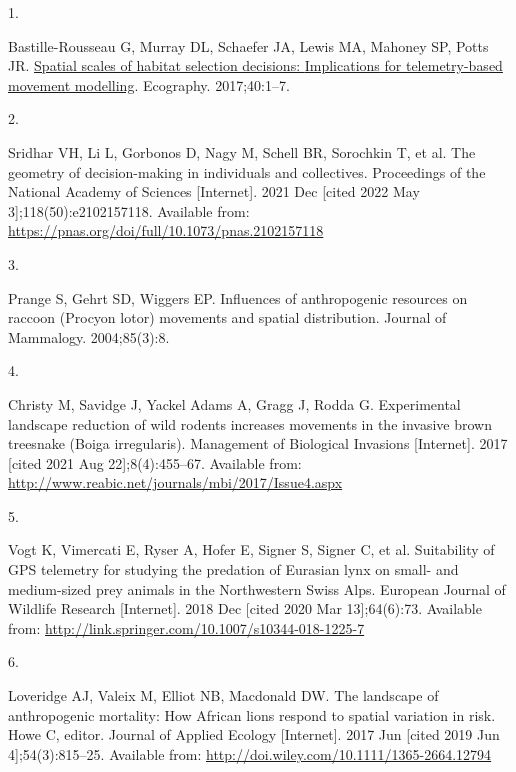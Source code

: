\documentclass[10pt,a4paper]{article}
\newlength{\cslhangindent}
\newlength{\csllabelwidth}
\newlength{\cslentryspacingunit} %
\newenvironment{CSLReferences}[2] %
 {%
  \setlength{\parindent}{0pt}
  \ifodd #1
  \let\oldpar\par
  \def\par{\hangindent=\cslhangindent\oldpar}
  \fi
  \setlength{\parskip}{#2\cslentryspacingunit}
 }%
 {}
\newcommand{\CSLLeftMargin}[1]{\parbox[t]{\csllabelwidth}{#1}}
\newcommand{\CSLRightInline}[1]{\parbox[t]{\linewidth - \csllabelwidth}{#1}\break}
\begin{document}
\hypertarget{refs}{}
\begin{CSLReferences}{0}{0}
\leavevmode{}%
\CSLLeftMargin{1. }
\CSLRightInline{Bastille-Rousseau G, Murray DL, Schaefer JA, Lewis MA, Mahoney SP, Potts JR. \href{https://doi.org/10.1111/ecog.02655}{Spatial scales of habitat selection decisions: {Implications} for telemetry-based movement modelling}. Ecography. 2017;40:1--7. }

\leavevmode{}%
\CSLLeftMargin{2. }
\CSLRightInline{Sridhar VH, Li L, Gorbonos D, Nagy M, Schell BR, Sorochkin T, et al. The geometry of decision-making in individuals and collectives. Proceedings of the National Academy of Sciences {[}Internet{]}. 2021 Dec {[}cited 2022 May 3{]};118(50):e2102157118. Available from: \url{https://pnas.org/doi/full/10.1073/pnas.2102157118}}

\leavevmode{}%
\CSLLeftMargin{3. }
\CSLRightInline{Prange S, Gehrt SD, Wiggers EP. Influences of anthropogenic resources on raccoon ({Procyon} lotor) movements and spatial distribution. Journal of Mammalogy. 2004;85(3):8. }

\leavevmode{}%
\CSLLeftMargin{4. }
\CSLRightInline{Christy M, Savidge J, Yackel Adams A, Gragg J, Rodda G. Experimental landscape reduction of wild rodents increases movements in the invasive brown treesnake ({Boiga} irregularis). Management of Biological Invasions {[}Internet{]}. 2017 {[}cited 2021 Aug 22{]};8(4):455--67. Available from: \url{http://www.reabic.net/journals/mbi/2017/Issue4.aspx}}

\leavevmode{}%
\CSLLeftMargin{5. }
\CSLRightInline{Vogt K, Vimercati E, Ryser A, Hofer E, Signer S, Signer C, et al. Suitability of {GPS} telemetry for studying the predation of {Eurasian} lynx on small- and medium-sized prey animals in the {Northwestern} {Swiss} {Alps}. European Journal of Wildlife Research {[}Internet{]}. 2018 Dec {[}cited 2020 Mar 13{]};64(6):73. Available from: \url{http://link.springer.com/10.1007/s10344-018-1225-7}}

\leavevmode{}%
\CSLLeftMargin{6. }
\CSLRightInline{Loveridge AJ, Valeix M, Elliot NB, Macdonald DW. The landscape of anthropogenic mortality: How {African} lions respond to spatial variation in risk. Howe C, editor. Journal of Applied Ecology {[}Internet{]}. 2017 Jun {[}cited 2019 Jun 4{]};54(3):815--25. Available from: \url{http://doi.wiley.com/10.1111/1365-2664.12794}}


\end{CSLReferences}
\end{document}
